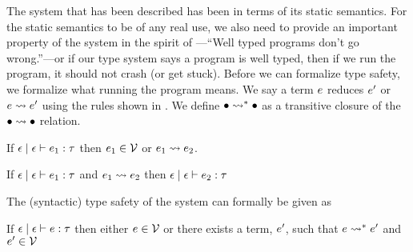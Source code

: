 \documentclass[format=acmsmall,manuscript,review,screen,nonacm,margin=1in,11pt]{acmart}
\begin{document}
The system that has been described has been in terms of its static semantics.
For the static semantics to be of any real use, we also need to provide an important property
of the system in the spirit of \cite{milner_theory_1978}---``Well typed programs
don't go wrong.''---or if our type system says a program is well typed, then if we run the program,
it should not crash (or get stuck). Before we can formalize type safety, we formalize
what running the program means. We say a term $e$ reduces $e'$ or $e \rightsquigarrow e'$
using the rules shown in .
We define $\bullet \rightsquigarrow^* \bullet$ as a transitive closure of the $\bullet \rightsquigarrow \bullet$ relation.

\begin{lemma}\label{lem:tcfd-prog}
  If $\epsilon \mid \epsilon \vdash e_1 : \tau$ then $e_1 \in \mathcal{V}$ or $e_1 \rightsquigarrow e_2$.
\end{lemma}

\begin{lemma}\label{lem:tcfd-preserve}
  If $\epsilon \mid \epsilon \vdash e_1 : \tau$ and $e_1 \rightsquigarrow e_2$ then $\epsilon \mid \epsilon \vdash e_2 : \tau$
\end{lemma}

The (syntactic) type safety of the system can formally be given as
\begin{lemma}
  If $\epsilon \mid \epsilon \vdash e : \tau$ then either $e \in \mathcal{V}$ or there exists a term, $e'$, such that
  $e \rightsquigarrow^* e'$ and $e' \in \mathcal{V}$
\end{lemma}


\end{document}
